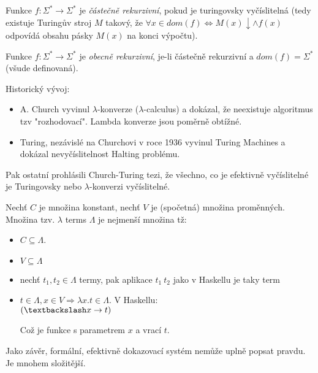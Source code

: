 \begin{definition}
    Funkce $f: \Sigma^*\rightarrow\Sigma^*$ je \emph{částečně rekurzivní}, pokud je turingovsky vyčíslitelná (tedy existuje Turingův stroj $M$ takový, že $\forall x \in dom(f)\Leftrightarrow M(x)\downarrow \land f(x)$ odpovídá obsahu pásky $M(x)$ na konci výpočtu).

    Funkce $f: \Sigma^*\to \Sigma^*$ je \emph{obecně rekurzivní}, je-li částečně rekurzivní a $dom(f)=\Sigma^*$ (všude definovaná).
\end{definition}

\begin{note}
	Historický vývoj:
	\begin{itemize}
		\item A. Church vyvinul $\lambda$-konverze ($\lambda$-calculus) a dokázal, že neexistuje algoritmus tzv "rozhodovací".
		Lambda konverze jsou poměrně obtížné.
		\item Turing, nezávislé na Churchovi v roce 1936 vyvinul Turing Machines a dokázal nevyčíslitelnost Halting problému.
	\end{itemize}

	Pak ostatní prohlásili Church-Turing tezi, že všechno, co je efektivně vyčíslitelné je Turingovsky nebo $\lambda$-konverzi vyčíslitelné.
\end{note}

\begin{definition}
	Nechť $C$ je množina konstant, nechť $V$ je (spočetná) množina proměnných.
	Množina tzv. $\lambda$ terms $\Lambda$ je nejmenší množina tž:
	\begin{itemize}
		\item $C \subseteq \Lambda$.
		\item $V \subseteq \Lambda$
		\item nechť $t_1, t_2 \in \Lambda$ termy, pak aplikace $t_1\ t_2$ jako v Haskellu je taky term
		\item $t \in \Lambda, x \in V \Rightarrow \lambda x . t \in \Lambda$.
			V Haskellu:\\ $(\textbackslash x \to t)$

			Což je funkce s parametrem $x$ a vrací $t$.
	\end{itemize}
\end{definition}

Jako závěr, formální, efektivně dokazovací systém nemůže uplně popsat pravdu. Je mnohem složitější.

